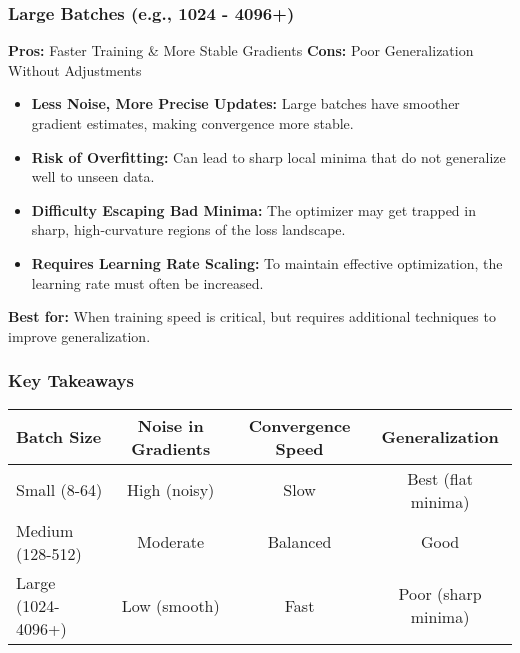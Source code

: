 \documentclass{article}
\begin{document}
\subsubsection{Large Batches (e.g., 1024 - 4096+)}
\textbf{Pros:} Faster Training \& More Stable Gradients\newline
\textbf{Cons:} Poor Generalization Without Adjustments\newline
\begin{itemize}
    \item \textbf{Less Noise, More Precise Updates:} Large batches have smoother gradient estimates, making convergence more stable.
    \item \textbf{Risk of Overfitting:} Can lead to sharp local minima that do not generalize well to unseen data.
    \item \textbf{Difficulty Escaping Bad Minima:} The optimizer may get trapped in sharp, high-curvature regions of the loss landscape.
    \item \textbf{Requires Learning Rate Scaling:} To maintain effective optimization, the learning rate must often be increased.
\end{itemize}
\textbf{Best for:} When training speed is critical, but requires additional techniques to improve generalization.

\subsubsection{Key Takeaways}
\begin{center}
\begin{tabular}{lccc}
\toprule
Batch Size & Noise in Gradients & Convergence Speed & Generalization \\
\midrule
Small (8-64) & High (noisy) & Slow & Best (flat minima) \\
Medium (128-512) & Moderate & Balanced & Good \\
Large (1024-4096+) & Low (smooth) & Fast & Poor (sharp minima) \\
\bottomrule
\end{tabular}
\end{center}
\end{document}
